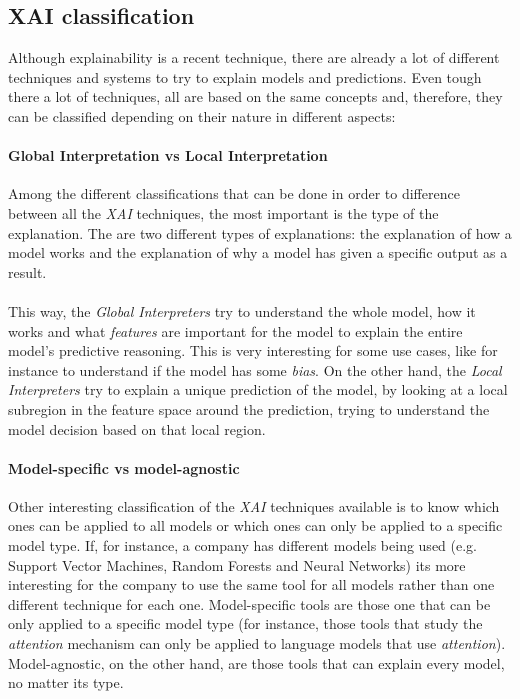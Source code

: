 \subsection{XAI classification}
\label{sec:xai-classification}
\noindent Although explainability is a recent technique, there are already a lot of different techniques and systems to try to explain models and predictions. Even tough there a lot of techniques, all are based on the same concepts and, therefore, they can be classified depending on their nature in different aspects:
\paragraph{Global Interpretation vs Local Interpretation} Among the different classifications that can be done in order to difference between all the \emph{XAI} techniques, the most important is the type of the explanation. The are two different types of explanations: the explanation of how a model works and the explanation of why a model has given a specific output as a result. 
\paragraph{}
This way, the \emph{Global Interpreters} try to understand the whole model, how it works and what \emph{features} are important for the model to explain the entire model's predictive reasoning. This is very interesting for some use cases, like for instance to understand if the model has some \emph{bias}. On the other hand, the \emph{Local Interpreters} try to explain a unique prediction of the model, by looking at a local subregion in the feature space around the prediction, trying to understand the model decision based on that local region.
\paragraph{Model-specific vs model-agnostic} Other interesting classification of the \emph{XAI} techniques available is to know which ones can be applied to all models or which ones can only be applied to a specific model type. If, for instance, a company has different models being used (e.g. Support Vector Machines, Random Forests and Neural Networks) its more interesting for the company to use the same tool for all models rather than one different technique for each one. Model-specific tools are those one that can be only applied to a specific model type (for instance, those tools that study the \emph{attention} mechanism can only be applied to language models that use \emph{attention}). Model-agnostic, on the other hand, are those tools that can explain every model, no matter its type.
